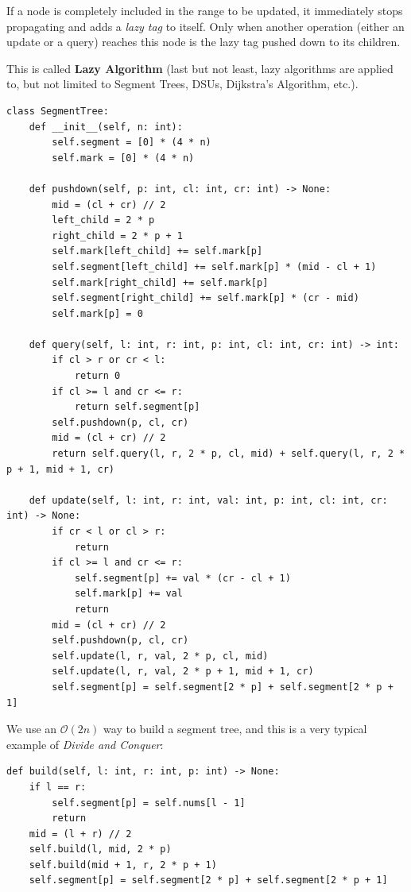 \documentclass{article}
\begin{document}
If a node is completely included in the range to be updated, it immediately stops propagating and adds a \emph{lazy tag} to itself. Only when another operation (either an update or a query) reaches this node is the lazy tag pushed down to its children.

This is called \textbf{Lazy Algorithm} (last but not least, lazy algorithms are applied to, but not limited to Segment Trees, DSUs, Dijkstra's Algorithm, etc.).

\begin{lstlisting}[style=python]
class SegmentTree:
    def __init__(self, n: int):
        self.segment = [0] * (4 * n)
        self.mark = [0] * (4 * n)

    def pushdown(self, p: int, cl: int, cr: int) -> None:
        mid = (cl + cr) // 2
        left_child = 2 * p
        right_child = 2 * p + 1
        self.mark[left_child] += self.mark[p]
        self.segment[left_child] += self.mark[p] * (mid - cl + 1)
        self.mark[right_child] += self.mark[p]
        self.segment[right_child] += self.mark[p] * (cr - mid)
        self.mark[p] = 0

    def query(self, l: int, r: int, p: int, cl: int, cr: int) -> int:
        if cl > r or cr < l:
            return 0
        if cl >= l and cr <= r:
            return self.segment[p]
        self.pushdown(p, cl, cr)
        mid = (cl + cr) // 2
        return self.query(l, r, 2 * p, cl, mid) + self.query(l, r, 2 * p + 1, mid + 1, cr)

    def update(self, l: int, r: int, val: int, p: int, cl: int, cr: int) -> None:
        if cr < l or cl > r:
            return
        if cl >= l and cr <= r:
            self.segment[p] += val * (cr - cl + 1)
            self.mark[p] += val
            return
        mid = (cl + cr) // 2
        self.pushdown(p, cl, cr)
        self.update(l, r, val, 2 * p, cl, mid)
        self.update(l, r, val, 2 * p + 1, mid + 1, cr)
        self.segment[p] = self.segment[2 * p] + self.segment[2 * p + 1]
\end{lstlisting}

We use an $\mathcal O(2n)$ way to build a segment tree, and this is a very typical example of \emph{Divide and Conquer}:

\begin{lstlisting}[style=python]
def build(self, l: int, r: int, p: int) -> None:
    if l == r:
        self.segment[p] = self.nums[l - 1]
        return
    mid = (l + r) // 2
    self.build(l, mid, 2 * p)
    self.build(mid + 1, r, 2 * p + 1)
    self.segment[p] = self.segment[2 * p] + self.segment[2 * p + 1]
\end{lstlisting}
\end{document}
